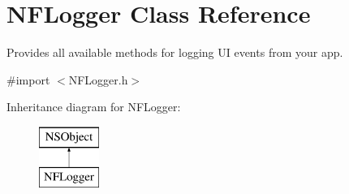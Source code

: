 \hypertarget{interface_n_f_logger}{}\section{N\+F\+Logger Class Reference}
\label{interface_n_f_logger}


Provides all available methods for logging UI events from your app.  




{\ttfamily \#import $<$N\+F\+Logger.\+h$>$}

Inheritance diagram for N\+F\+Logger\+:\begin{figure}[H]
\begin{center}
\leavevmode
\includegraphics[height=2.000000cm]{interface_n_f_logger}
\end{center}
\end{figure}

